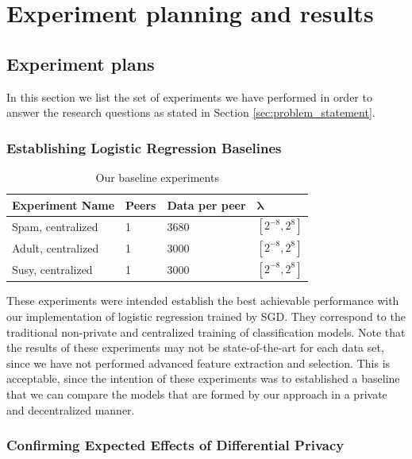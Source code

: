 
\chapter{Experiment planning and results}


\section{Experiment plans}
\label{sec:experiment_plan}

In this section we list the set of experiments we have performed in order to answer the research questions as stated in Section \ref{sec:problem_statement}. 


\subsection{Establishing Logistic Regression Baselines}

\begin{table}[h]
	\centering
	\caption{Our baseline experiments}
	\label{tab:experiments_baselines}
	\begin{tabular}{|l|l|l|l|}
		\textbf{Experiment Name}    & \textbf{Peers} & \textbf{Data per peer} & $\boldsymbol{\lambda}$      \\
		\hline
		Spam, centralized  & 1     & 3680 & $[2^{-8},2^{8}]$ \\
		Adult, centralized & 1     & 3000 & $[2^{-8},2^{8}]$ \\
		Susy, centralized  & 1     & 3000 & $[2^{-8},2^{8}]$
	\end{tabular}
\end{table}

These experiments were intended establish the best achievable performance with our implementation of logistic regression trained by SGD. They correspond to the traditional non-private and centralized training of classification models. Note that the results of these experiments may not be state-of-the-art for each data set, since we have not performed advanced feature extraction and selection. This is acceptable, since the intention of these experiments was to established a baseline that we can compare the models that are formed by our approach in a private and decentralized manner.


\subsection{Confirming Expected Effects of Differential Privacy}

